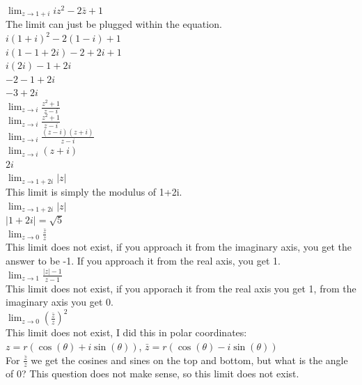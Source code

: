 \documentclass[12pt]{article}
\begin{document}
 $\lim_{z \to 1+i} iz^2 - 2\bar{z} + 1$ \\
The limit can just be plugged within the equation.\\
$i(1+i)^2 - 2(1-i) + 1$\\
$i(1-1 + 2i) - 2 + 2i + 1$\\
$i(2i) - 1 + 2i$\\
$-2 - 1 + 2i$\\
$-3 + 2i$\\

 $\lim_{z \to i} \frac{z^2 + 1}{z-i}$ \\
$\lim_{z \to i} \frac{z^2+1}{z-i}$\\
$\lim_{z \to i} \frac{(z-i)(z+i)}{z-i}$\\
$\lim_{z \to i} (z+i)$\\
$2i$\\


 $\lim_{z \to 1+2i} |z|$ \\
This limit is simply the modulus of 1+2i.\\
$\lim_{z \to 1 + 2i} |z|$\\
$|1+2i| = \sqrt{5}$\\


 $\lim_{z \to 0} \frac{\bar{z}}{z}$ \\
This limit does not exist, if you approach it from the imaginary axis, you get the answer to be -1. 
If you approach it from the real axis, you get 1.\\

 $\lim_{z \to 1} \frac{|z|-1}{z-1}$ \\
This limit does not exist, if you apporach it from the real axis you get 1, from the imaginary axis you get 0.\\

 $\lim_{z \to 0} (\frac{\bar{z}}{z})^2$ \\
This limit does not exist, I did this in polar coordinates:\\
$z = r(\cos(\theta) + i\sin(\theta))$, $\bar{z} = r(\cos(\theta) - i\sin(\theta))$\\

For $\frac{\bar{z}}{z}$ we get the cosines and sines on the top and bottom, but what is the angle of 0? 
This question does not make sense, so this limit does not exist.\\

 \\
\end{document}
